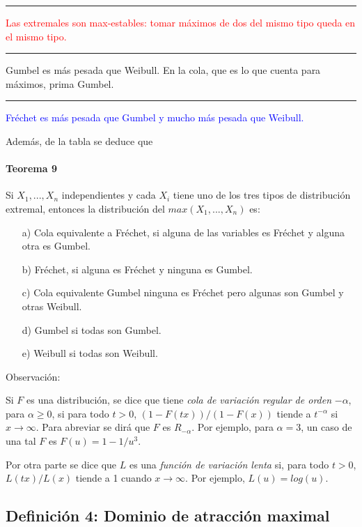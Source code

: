 \documentclass[
  oneside]{book}
\begin{document}
\textcolor{red}{\rule{1em}{1em} Las extremales son max-estables: tomar máximos de dos del mismo tipo queda en el mismo tipo.}

\textcolor[rgb]{0.0,0.5,0.0}{\rule{1em}{1em} Gumbel es más pesada que Weibull. En la cola, que es lo que cuenta para máximos, prima Gumbel.}

\textcolor{blue}{\rule{1em}{1em} Fréchet es más pesada que Gumbel y mucho más pesada que Weibull.}
\vspace{1cm}

Además, de la tabla se deduce que

\hypertarget{teorema-9}{%
\paragraph{Teorema 9}\label{teorema-9}}

Si \(X_1,...,X_n\) independientes y cada \(X_i\) tiene uno de los tres
tipos de distribución extremal, entonces la distribución del
\(max(X_1,...,X_n)\) es:

\begin{itemize}
\item[a)] Cola equivalente a Fréchet, si alguna de las variables es Fréchet y alguna otra es Gumbel.
\item[b)]  Fréchet, si alguna es Fréchet y ninguna es Gumbel.
\item[c)]  Cola equivalente Gumbel ninguna es Fréchet pero algunas son Gumbel y otras Weibull.
\item[d)] Gumbel si todas son Gumbel.
\item[e)]  Weibull si todas son Weibull.
\end{itemize}

Observación:

Si \(F\) es una distribución, se dice que tiene
\textit{cola de variación regular de orden} \(-\alpha\), para
\(\alpha \geq 0\), si para todo \(t>0\), \((1-F(tx))/(1-F(x))\) tiende a
\(t^{-\alpha}\) si \(x \rightarrow \infty\). Para abreviar se dirá que
\(F\) es \(R_{-\alpha}\). Por ejemplo, para \(\alpha=3\), un caso de una
tal \(F\) es \(F(u)=1- 1/u^3\).

Por otra parte se dice que \(L\) es una
\textit{función de variación lenta} si, para todo \(t>0\),
\(L(tx)/L(x)\) tiende a 1 cuando \(x \rightarrow \infty\). Por ejemplo,
\(L(u)=log(u)\).

\newpage

\hypertarget{definiciuxf3n-4-dominio-de-atracciuxf3n-maximal}{%
\subsection{Definición 4: Dominio de atracción
maximal}\label{definiciuxf3n-4-dominio-de-atracciuxf3n-maximal}}
\end{document}
